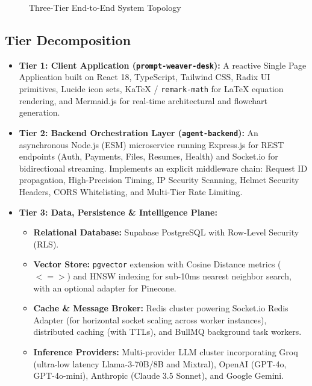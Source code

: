 \documentclass[10pt,a4paper]{article}
\begin{document}
\begin{figure}[h!]
\caption{Three-Tier End-to-End System Topology}
\end{figure}

\subsection{Tier Decomposition}
\begin{itemize}[leftmargin=*]
    \item \textbf{Tier 1: Client Application (\texttt{prompt-weaver-desk}):} A reactive Single Page Application built on React 18, TypeScript, Tailwind CSS, Radix UI primitives, Lucide icon sets, KaTeX / \texttt{remark-math} for LaTeX equation rendering, and Mermaid.js for real-time architectural and flowchart generation.
    \item \textbf{Tier 2: Backend Orchestration Layer (\texttt{agent-backend}):} An asynchronous Node.js (ESM) microservice running Express.js for REST endpoints (Auth, Payments, Files, Resumes, Health) and Socket.io for bidirectional streaming. Implements an explicit middleware chain: Request ID propagation, High-Precision Timing, IP Security Scanning, Helmet Security Headers, CORS Whitelisting, and Multi-Tier Rate Limiting.
    \item \textbf{Tier 3: Data, Persistence \& Intelligence Plane:}
    \begin{itemize}
        \item \textbf{Relational Database:} Supabase PostgreSQL with Row-Level Security (RLS).
        \item \textbf{Vector Store:} \texttt{pgvector} extension with Cosine Distance metrics ($<=>$) and HNSW indexing for sub-10ms nearest neighbor search, with an optional adapter for Pinecone.
        \item \textbf{Cache \& Message Broker:} Redis cluster powering Socket.io Redis Adapter (for horizontal socket scaling across worker instances), distributed caching (with TTLs), and BullMQ background task workers.
        \item \textbf{Inference Providers:} Multi-provider LLM cluster incorporating Groq (ultra-low latency Llama-3-70B/8B and Mixtral), OpenAI (GPT-4o, GPT-4o-mini), Anthropic (Claude 3.5 Sonnet), and Google Gemini.
    \end{itemize}
\end{itemize}
\end{document}

